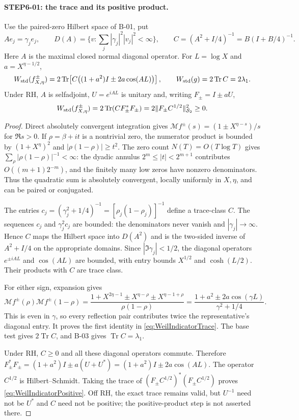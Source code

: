 \documentclass[11pt,a4paper]{article}
\newcommand{\Tr}{\operatorname{Tr}}
\newcommand{\M}{\mathcal M}
\newcommand{\fid}[1]{\textsf{#1}}
\begin{document}
\paragraph{STEP6-01: the trace and its positive product.}
Use the paired-zero Hilbert space of \fid{B-01}, put
\[
 Ae_j=\gamma_je_j,\qquad
 D(A)=\{v:\sum_j|\gamma_j|^2|v_j|^2<\infty\},\qquad
 C=(A^2+I/4)^{-1}=B(I+B/4)^{-1}.
\]
Here $A$ is the maximal closed normal diagonal operator. For $L=\log X$ and $a=X^{\eta-1/2}$,
\begin{equation}\label{eq:WeilIndicatorTrace}
 W_{\rm std}(f^\pm_{X,\eta})
 =2\Tr\!\left[C\bigl((1+a^2)I\pm2a\cos(AL)\bigr)\right],
 \qquad W_{\rm std}(g)=2\Tr C=2\lambda_1.
\end{equation}
Under RH, $A$ is selfadjoint, $U=e^{iAL}$ is unitary and, writing $F_\pm=I\pm aU$,
\begin{equation}\label{eq:WeilIndicatorPositive}
 W_{\rm std}(f^\pm_{X,\eta})
 =2\Tr(CF_\pm^*F_\pm)
 =2\|F_\pm C^{1/2}\|_{\mathcal S_2}^{2}\ge0.
\end{equation}
\begin{proof}
Direct absolutely convergent integration gives $\M f^\pm(s)=(1\pm X^{\eta-s})/s$ for $\Re s>0$. If $\rho=\beta+it$ is a nontrivial zero, the numerator product is bounded by $(1+X^\eta)^2$ and $|\rho(1-\rho)|\ge t^2$. The zero count $N(T)=O(T\log T)$ gives
$\sum_\rho|\rho(1-\rho)|^{-1}<\infty$: the dyadic annulus $2^m\le|t|<2^{m+1}$ contributes $O((m+1)2^{-m})$, and the finitely many low zeros have nonzero denominators. Thus the quadratic sum is absolutely convergent, locally uniformly in $X,\eta$, and can be paired or conjugated.

The entries $c_j=(\gamma_j^2+1/4)^{-1}=[\rho_j(1-\rho_j)]^{-1}$ define a trace-class $C$. The sequences $c_j$ and $\gamma_j^2c_j$ are bounded: the denominators never vanish and $|\gamma_j|\to\infty$. Hence $C$ maps the Hilbert space into $D(A^2)$ and is the two-sided inverse of $A^2+I/4$ on the appropriate domains. Since $|\Im\gamma_j|<1/2$, the diagonal operators $e^{\pm iAL}$ and $\cos(AL)$ are bounded, with entry bounds $X^{1/2}$ and $\cosh(L/2)$. Their products with $C$ are trace class.

For either sign, expansion gives
\[
 \M f^\pm(\rho)\M f^\pm(1-\rho)
 =\frac{1+X^{2\eta-1}\pm X^{\eta-\rho}\pm X^{\eta-1+\rho}}
 {\rho(1-\rho)}
 =\frac{1+a^2\pm2a\cos(\gamma L)}{\gamma^2+1/4}.
\]
This is even in $\gamma$, so every reflection pair contributes twice the representative's diagonal entry. It proves the first identity in \eqref{eq:WeilIndicatorTrace}. The base test gives $2\Tr C$, and \fid{B-03} gives $\Tr C=\lambda_1$.

Under RH, $C\ge0$ and all these diagonal operators commute. Therefore
$F_\pm^*F_\pm=(1+a^2)I\pm a(U+U^*)=(1+a^2)I\pm2a\cos(AL)$.
The operator $C^{1/2}$ is Hilbert--Schmidt. Taking the trace of
$(F_\pm C^{1/2})^*(F_\pm C^{1/2})$ proves \eqref{eq:WeilIndicatorPositive}. Off RH, the exact trace remains valid, but $U^{-1}$ need not be $U^*$ and $C$ need not be positive; the positive-product step is not asserted there.
\end{proof}
\end{document}
